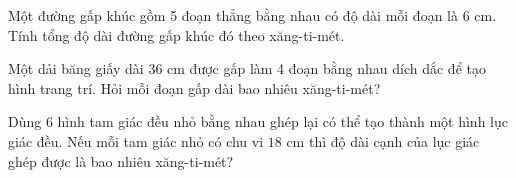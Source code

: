 \begin{ex} %
Một đường gấp khúc gồm 5 đoạn thẳng bằng nhau có độ dài mỗi đoạn là $6\text{ cm}$. Tính tổng độ dài đường gấp khúc đó theo xăng-ti-mét.
\end{ex}

\begin{ex} %
Một dải băng giấy dài $36\text{ cm}$ được gấp làm 4 đoạn bằng nhau dích dắc để tạo hình trang trí. Hỏi mỗi đoạn gấp dài bao nhiêu xăng-ti-mét?
\end{ex}

\begin{ex} %
Dùng 6 hình tam giác đều nhỏ bằng nhau ghép lại có thể tạo thành một hình lục giác đều. Nếu mỗi tam giác nhỏ có chu vi $18\text{ cm}$ thì độ dài cạnh của lục giác ghép được là bao nhiêu xăng-ti-mét?
\end{ex}
